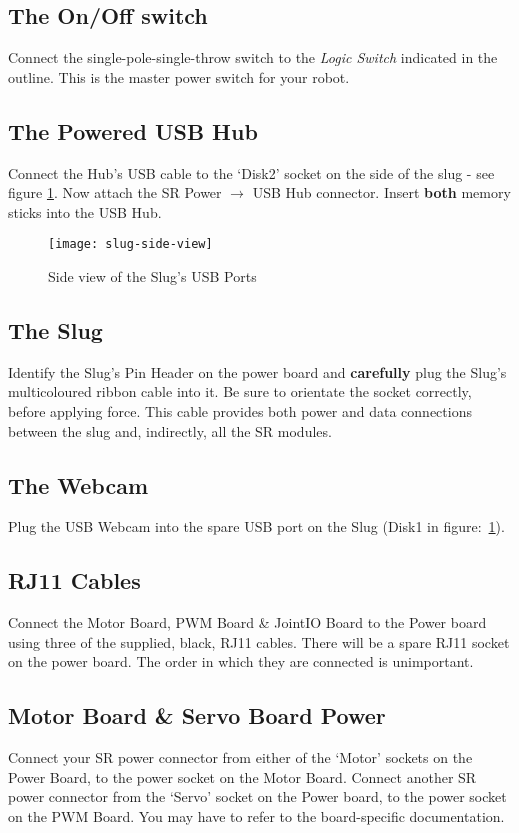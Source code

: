 \subsection{The On/Off switch}
Connect the single-pole-single-throw switch to the \textit{Logic Switch} indicated in the outline. This is the master power switch for your robot.

\subsection{The Powered USB Hub}
Connect the Hub's USB cable to the `Disk2' socket on the side of the slug - see figure \ref{fig:slug-side}. Now attach the SR Power \(\rightarrow\) USB Hub connector. Insert \textbf{both} memory sticks into the USB Hub.

\begin{figure}[h!]
\center
\texttt{[image: slug-side-view]}
\caption{Side view of the Slug's USB Ports}
\label{fig:slug-side}
\end{figure}

\subsection{The Slug}
Identify the Slug's Pin Header on the power board and \textbf{carefully} plug the Slug's multicoloured ribbon cable into it. Be sure to orientate the socket correctly, before applying force. This cable provides both power and data connections between the slug and, indirectly, all the SR modules.

\subsection{The Webcam}
Plug the USB Webcam into the spare USB port on the Slug (Disk1 in figure:\ \ref{fig:slug-side}).

\subsection{RJ11 Cables}
Connect the Motor Board, PWM Board \& JointIO Board to the Power board using three of the supplied, black, RJ11 cables. There will be a spare RJ11 socket on the power board. The order in which they are connected is unimportant. 

\subsection{Motor Board \& Servo Board Power}
Connect your SR power connector from either of the `Motor' sockets on the Power Board, to the power socket on the Motor Board. Connect another SR power connector from the `Servo' socket on the Power board, to the power socket on the PWM Board. You may have to refer to the board-specific documentation. 

